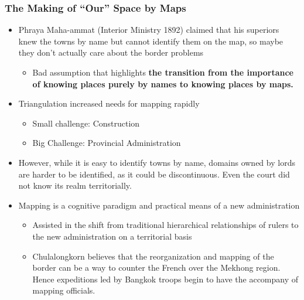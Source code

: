 \documentclass[a4paper]{article}
\begin{document}
\subsubsection{The Making of ``Our'' Space by Maps}
\begin{itemize}
	\item Phraya Maha-ammat (Interior Ministry 1892) claimed that his superiors knew the towns by name but cannot identify them on the map, so maybe they don't actually care about the border problems
	\begin{itemize}[label=$\circ$]
		\item Bad assumption that highlights \textbf{the transition from the importance of knowing places purely by names to knowing places by maps.}
	\end{itemize}
	\item Triangulation increased needs for mapping rapidly
	\begin{itemize}[label=$\circ$]
		\item Small challenge: Construction
		\item Big Challenge: Provincial Administration
	\end{itemize}
	\item However, while it is easy to identify towns by name, domains owned by lords are harder to be identified,  as it could be discontinuous. Even the court did not know its realm territorially.
	\item Mapping is a cognitive paradigm and practical means of a new administration
	\begin{itemize}[label=$\circ$]
		\item Assisted in the shift from traditional hierarchical relationships of rulers to the new administration on a territorial basis
		\item Chulalongkorn believes that the reorganization and mapping of the border can be a way to counter the French over the Mekhong region. Hence expeditions led by Bangkok troops begin to have the accompany of mapping officials.
	\end{itemize}
\end{itemize}
\end{document}
